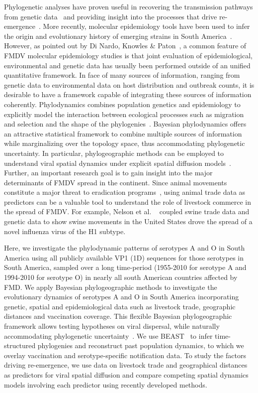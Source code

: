 \documentclass[10pt]{article}
\begin{document}
Phylogenetic analyses have proven useful in recovering the transmission pathways from genetic data~\cite{cottam2007, cottam2008} and providing insight into the processes that drive re-emergence~\cite{combining}.
More recently, molecular epidemiology tools have been used to infer the origin and evolutionary history of emerging strains in South America~\cite{Perez2001, Malirat2007, andean, Malirat2011, Maradei2013}.
However, as pointed out by Di Nardo, Knowles \& Paton~\cite{combining}, a common feature of FMDV molecular epidemiology studies is that  joint evaluation of epidemiological, environmental and genetic data has usually been performed outside of an unified quantitative framework.
In face of many sources of information, ranging from genetic data to environmental data on host distribution and outbreak counts, it is desirable to have a framework capable of integrating these sources of information coherently.
Phylodynamics combines population genetics and epidemiology to explicitly  model the interaction between ecological processes such as migration and selection and the shape of the phylogenies~\cite{grenfell, vphylodynamics}.
Bayesian phylodynamics offers an attractive statistical framework to combine multiple sources of information while marginalizing over the topology space, thus accommodating phylogenetic uncertainty.
In particular, phylogeographic methods can be employed to understand viral spatial dynamics under explicit spatial diffusion models~\cite{roots}.
Further, an important research goal is to gain insight into the major determinants of FMDV spread in the continent.
Since animal movements constitute a major threat to eradication programs~\cite{movements}, using animal trade data as predictors can be a valuable tool to understand the role of livestock commerce in the spread of FMDV.
For example, Nelson et al. ~\cite{Nelson2011} coupled swine trade data and genetic data to show swine movements in the United States drove the spread of a novel influenza virus of the H1 subtype.

Here, we investigate the phylodynamic patterns of serotypes A and O in South America using all publicly available VP1 (1D) sequences for those serotypes in South America, sampled over a long time-period (1955-2010 for serotype A and 1994-2010 for serotype O) in nearly all south American countries affected by FMD.
We apply Bayesian phylogeographic methods to investigate the evolutionary dynamics of serotypes A and O in South America incorporating  genetic, spatial and epidemiological data such as livestock trade, geographic distances and vaccination coverage.
This flexible Bayesian phylogeographic framework allows testing hypotheses on viral dispersal, while naturally accommodating phylogenetic uncertainty~\cite{roots, towards}.
We use BEAST~\cite{beast2012} to infer time-structured phylogenies and reconstruct past population dynamics, to which we overlay vaccination and serotype-specific notification data.
To study the factors driving re-emergence, we use data on livestock trade and geographical distances as predictors for viral spatial diffusion and compare competing spatial dynamics models involving each predictor using recently developed methods. 
\end{document}
